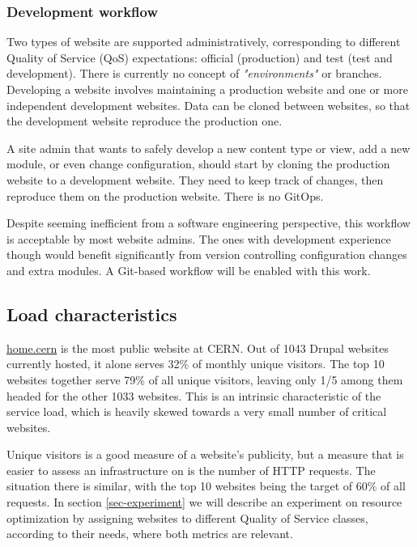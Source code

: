 \subsubsection*{Development workflow}

Two types of website are supported administratively, corresponding to different Quality of Service (QoS) expectations: official (production) and test (test and development).
There is currently no concept of \emph{"environments"} or branches. Developing a website involves maintaining a production website and one or more independent development websites.
Data can be cloned between websites, so that the development website reproduce the production one.

A site admin that wants to safely develop a new content type or view, add a new module, or even change configuration, should start by cloning the production website to a development website.
They need to keep track of changes, then reproduce them on the production website.
There is no GitOps.

Despite seeming inefficient from a software engineering perspective, this workflow is acceptable by most website admins.
The ones with development experience though would benefit significantly from version controlling configuration changes and extra modules.
A Git-based workflow will be enabled with this work.

\subsection{Load characteristics}

\href{https://home.cern/}{home.cern} is the most public website at CERN.
Out of 1043 Drupal websites currently hosted, it alone serves 32\% of monthly unique visitors.
The top 10 websites together serve 79\% of all unique visitors, leaving only 1/5 among them headed for the other 1033 websites.
This is an intrinsic characteristic of the service load, which is heavily skewed towards a very small number of critical websites.

Unique visitors is a good measure of a website's publicity, but a measure that is easier to assess an infrastructure on is the number of HTTP requests.
The situation there is similar, with the top 10 websites being the target of 60\% of all requests.
In section \ref{sec-experiment} we will describe an experiment on resource optimization by assigning websites to different Quality of Service classes,
according to their needs, where both metrics are relevant.


